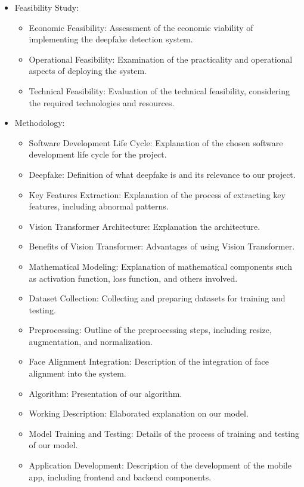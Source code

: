 \begin{itemize}
\begin{itemize}
      \end{itemize}
    \item Feasibility Study:
      \begin{itemize}
        \item Economic Feasibility: Assessment of the economic viability of implementing the deepfake detection system.
        \item Operational Feasibility: Examination of the practicality and operational aspects of deploying the system.
        \item Technical Feasibility: Evaluation of the technical feasibility, considering the required technologies and resources.
      \end{itemize}
    \item Methodology:
      \begin{itemize}
        \item Software Development Life Cycle: Explanation of the chosen software development life cycle for the project.
        \item Deepfake: Definition of what deepfake is and its relevance to our project.
        \item Key Features Extraction: Explanation of the process of extracting key features, including abnormal patterns.
        \item Vision Transformer Architecture: Explanation the architecture.
        \item Benefits of Vision Transformer: Advantages of using Vision Transformer.
        \item Mathematical Modeling: Explanation of mathematical components such as activation function, loss function, and others involved.
        \item Dataset Collection: Collecting and preparing datasets for training and testing.
        \item Preprocessing: Outline of the preprocessing steps, including resize, augmentation, and normalization.
        \item Face Alignment Integration: Description of the integration of face alignment into the system.
        \item Algorithm: Presentation of our algorithm.
        \item Working Description: Elaborated explanation on our model.
        \item Model Training and Testing: Details of the process of training and testing of our model.
        \item Application Development: Description of the development of the mobile app, including frontend and backend components.

\end{itemize}
\end{itemize}
